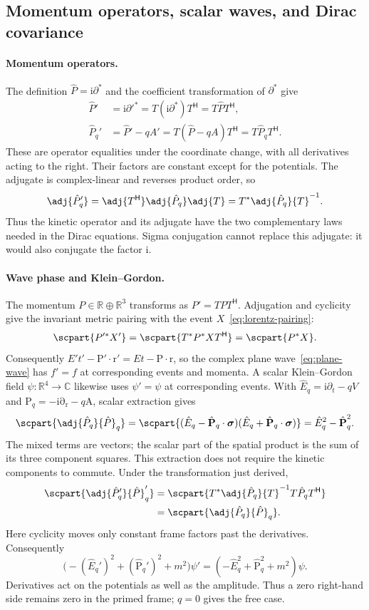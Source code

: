 \documentclass[11pt]{article}
\newcommand{\pv}[1]{{#1}}
\newcommand{\pvGreek}[1]{{#1}}
\newcommand{\vstyle}[1]{{\bm{\mathrm{#1}}}}
\newcommand{\pA}{\pv{A}}
\newcommand{\pP}{\pv{P}}
\newcommand{\pT}{\pv{T}}
\newcommand{\pX}{\pv{X}}
\newcommand{\pvpartial}{\pvGreek{\partial}}
\numberwithin{equation}{section}
\newcommand{\R}{\mathbb{R}}
\newcommand{\C}{\mathbb{C}}
\newcommand{\ii}{\mathrm{i}}
\newcommand{\dotprod}{\cdot}
\newcommand{\bsig}{\vstyle{\sigma}}
\newcommand{\bA}{\vstyle{A}}
\newcommand{\br}{\vstyle{r}}
\newcommand{\bp}{\vstyle{P}}
\newcommand{\hP}{{\hat{\pP}}}
\newcommand{\hEq}{\hat E_q}
\newcommand{\hbpq}{\hat{\bp}_q}
\newcommand{\hPq}{\hP_q}
\newcommand{\pdr}{\vstyle{\partial}_{\br}}
\begin{document}
\subsection{Momentum operators, scalar waves, and Dirac covariance}

\paragraph{Momentum operators.}
The definition $\hP=\ii\pvpartial^*$ and the coefficient transformation
of $\pvpartial^*$ give
\begin{align*}
 \hP'&=\ii\pvpartial'^*
 =\pT(\ii\pvpartial^*)\pT^{\mathsf H}
 =\pT\hP\pT^{\mathsf H},\\
 \hPq'&=\hP'-q\pA'
 =\pT(\hP-q\pA)\pT^{\mathsf H}
 =\pT\hPq\pT^{\mathsf H}.
\end{align*}
These are operator equalities under the coordinate change, with all
derivatives acting to the right. Their factors are constant except for the
potentials. The adjugate is complex-linear and reverses product order,
so
\[
 \adj{\hPq'}
 =\adj{\pT^{\mathsf H}}\adj{\hPq}\adj{\pT}
 =\pT^*\adj{\hPq}\pT^{-1}.
\]
Thus the kinetic operator and its adjugate have the two complementary
laws needed in the Dirac equations. Sigma conjugation cannot replace
this adjugate: it would also conjugate the factor $\ii$.

\paragraph{Wave phase and Klein--Gordon.}
The momentum $\pP\in\R\oplus\R^3$ transforms as
$\pP'=\pT\pP\pT^{\mathsf H}$. Adjugation and cyclicity give the
invariant metric pairing with the event $\pX$~\eqref{eq:lorentz-pairing}:
\begin{equation*}
 \scpart{\pP'^*\pX'}
 =\scpart{\pT^*\pP^*\pX\pT^{\mathsf H}}
 =\scpart{\pP^*\pX}.
\end{equation*}
Consequently $E't'-\bp'\dotprod\br'=Et-\bp\dotprod\br$, so the
complex plane wave~\eqref{eq:plane-wave} has $f'=f$ at corresponding events
and momenta.
A scalar Klein--Gordon field $\psi:\R^4\to\C$ likewise uses $\psi'=\psi$
at corresponding events. With $\hEq=\ii\partial_t-qV$ and
$\hbpq=-\ii\pdr-q\bA$, scalar extraction gives
\[
 \scpart{\adj{\hPq}\hPq}
 =\scpart{(\hEq-\hbpq\dotprod\bsig)(\hEq+\hbpq\dotprod\bsig)}
 =\hEq^2-\hbpq^2.
\]
The mixed terms are vectors; the scalar part of the spatial product is
the sum of its three component squares. This extraction does not require
the kinetic components to commute. Under the transformation just derived,
\begin{align*}
 \scpart{\adj{\hPq'}\hPq'}
 &=\scpart{\pT^*\adj{\hPq}\pT^{-1}\pT\hPq\pT^{\mathsf H}}\\
 &=\scpart{\adj{\hPq}\hPq}.
\end{align*}
Here cyclicity moves only constant frame factors past the derivatives.
Consequently
\[
 \boxed{\bigl(-({\hEq}')^2+({\hbpq}')^2+m^2\bigr)\psi'
 =(-\hEq^2+\hbpq^2+m^2)\psi.}
\]
Derivatives act on the potentials as well as the amplitude. Thus a zero
right-hand side remains zero in the primed frame; $q=0$ gives the free case.
\end{document}

